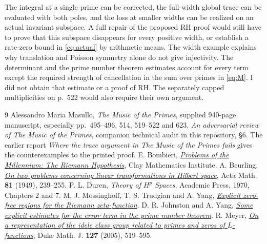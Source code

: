 \documentclass[11pt,letterpaper]{article}
\newcommand{\step}[1]{\par\smallskip{\color{ink}\bfseries #1}\enspace}
\begin{document}
\step{Conclusion.}
The integral at a single prime can be corrected, the full-width global trace can be evaluated with both poles, and the loss at smaller widths can be realized on an actual invariant subspace. A full repair of the proposed RH proof would still have to prove that this subspace disappears for every positive width, or establish a rate-zero bound in \eqref{eq:actual} by arithmetic means. The width example explains why translation and Poisson symmetry alone do not give injectivity. The determinant and the prime number theorem estimates account for every term except the required strength of cancellation in the sum over primes in \eqref{eq:M}. I did not obtain that estimate or a proof of RH. The separately capped multiplicities on p.~522 would also require their own argument.

\small
\begin{thebibliography}{9}
 Alessandro Maria Masullo, \emph{The Music of the Primes}, supplied 940-page manuscript, especially pp.~495--496, 514, 519--522 and 623.
 \emph{An adversarial review of The Music of the Primes}, companion technical audit in this repository, \S 6. The earlier report \emph{Where the trace argument in The Music of the Primes fails} gives the counterexamples to the printed proof.
 E. Bombieri, \href{https://www.claymath.org/wp-content/uploads/2022/05/riemann.pdf}{\emph{Problems of the Millennium: The Riemann Hypothesis}}, Clay Mathematics Institute.
 A. Beurling, \href{https://doi.org/10.1007/BF02395019}{\emph{On two problems concerning linear transformations in Hilbert space}}, Acta Math. \textbf{81} (1949), 239--255.
 P. L. Duren, \emph{Theory of \(H^p\) Spaces}, Academic Press, 1970, Chapters 2 and 7.
 M. J. Mossinghoff, T. S. Trudgian and A. Yang, \href{https://arxiv.org/abs/2212.06867}{\emph{Explicit zero-free regions for the Riemann zeta-function}}.
 D. R. Johnston and A. Yang, \href{https://arxiv.org/abs/2204.01980}{\emph{Some explicit estimates for the error term in the prime number theorem}}.
 R. Meyer, \href{https://arxiv.org/abs/math/0311468}{\emph{On a representation of the idele class group related to primes and zeros of \(L\)-functions}}, Duke Math. J. \textbf{127} (2005), 519--595.
\end{thebibliography}
\end{document}

